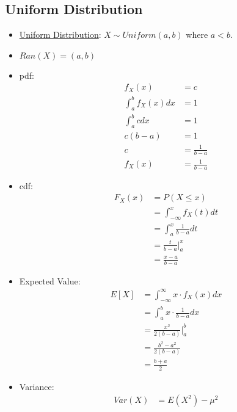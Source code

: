 \documentclass[12pt]{article}
\begin{document}
        \subsection{Uniform Distribution}
            \begin{itemize}
                \item \underline{Uniform Distribution}: $X \sim Uniform(a, b)$ where $a < b$.
                \item $Ran(X) = (a, b)$
                \item pdf:
                \begin{align*}
                    f_X(x) &= c \\
                    \int_a^b f_X(x) dx &= 1 \\
                    \int_a^b c dx &= 1 \\
                    c(b-a) &= 1 \\
                    c &= \frac{1}{b-a} \\
                    f_X(x) &= \frac{1}{b-a}
                \end{align*}
                \item cdf:
                \begin{align*}
                    F_X(x) &= P(X \leq x) \\
                    &= \int_{-\infty}^{x} f_X(t) dt \\
                    &= \int_{a}^{x} \frac{1}{b-a} dt \\
                    &= \frac{t}{b-a} \Big|_{a}^{x} \\
                    &= \frac{x-a}{b-a}
                \end{align*}
                \item Expected Value:
                \begin{align*}
                    E[X] &= \int_{-\infty}^{\infty} x \cdot f_X(x) dx \\
                    &= \int_{a}^{b} x \cdot \frac{1}{b-a} dx \\
                    &= \frac{x^2}{2(b-a)} \Big|_{a}^{b} \\
                    &= \frac{b^2 - a^2}{2(b-a)} \\
                    &= \frac{b+a}{2}
                \end{align*}
                \item Variance:
                \begin{align*}
                    Var(X) &= E(X^2) - \mu^2 \\

\end{align*}
\end{itemize}
\end{document}
